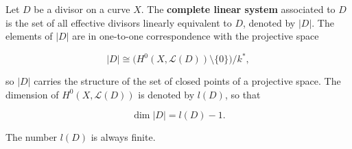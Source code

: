 Let $D$ be a divisor on a curve $X$. The \textbf{complete linear system} associated to $D$ is the set of all effective divisors linearly equivalent to $D$, denoted by $|D|$. The elements of $|D|$ are in one-to-one correspondence with the projective space

$$|D| \cong \bigl(H^0(X, \mathcal{L}(D)) \setminus \{0\}\bigr) / k^*,$$

so $|D|$ carries the structure of the set of closed points of a projective space. The dimension of $H^0(X, \mathcal{L}(D))$ is denoted by $l(D)$, so that

$$\dim |D| = l(D) - 1.$$

The number $l(D)$ is always finite.
